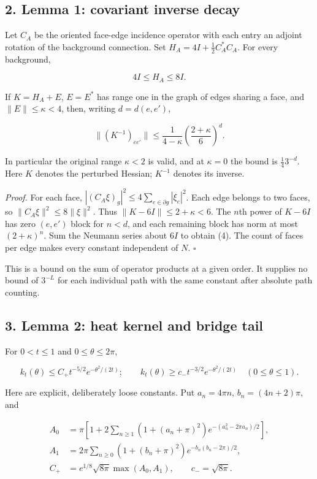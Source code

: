 \documentclass[11pt,a4paper]{article}
\begin{document}
\hypertarget{lemma-1-covariant-inverse-decay}{%
\subsection{2. Lemma 1: covariant inverse
decay}\label{lemma-1-covariant-inverse-decay}}

Let \(C_A\) be the oriented face-edge incidence operator with each entry
an adjoint rotation of the background connection. Set
\(H_A=4I+\frac12C_A^*C_A\). For every background,

\[4I\le H_A\le8I.\tag{3}\]

If \(K=H_A+E\), \(E=E^*\) has range one in the graph of edges sharing a
face, and \(\|E\|\le\kappa<4\), then, writing \(d=d(e,e')\),

\[\|(K^{-1})_{ee'}\|\le\frac1{4-\kappa}
\left(\frac{2+\kappa}{6}\right)^d.\tag{4}\]

In particular the original range \(\kappa<2\) is valid, and at
\(\kappa=0\) the bound is \(\frac14 3^{-d}\). Here \(K\) denotes the
perturbed Hessian; \(K^{-1}\) denotes its inverse.

\emph{Proof.} For each face,
\(|(C_A\xi)_g|^2\le4\sum_{e\in\partial g}|\xi_e|^2\). Each edge belongs
to two faces, so \(\|C_A\xi\|^2\le8\|\xi\|^2\). Thus
\(\|K-6I\|\le2+\kappa<6\). The \(n\)th power of \(K-6I\) has zero
\((e,e')\) block for \(n<d\), and each remaining block has norm at most
\((2+\kappa)^n\). Sum the Neumann series about \(6I\) to obtain (4). The
count of faces per edge makes every constant independent of \(N\).
\(\square\)

This is a bound on the sum of operator products at a given order. It
supplies no bound of \(3^{-L}\) for each individual path with the same
constant after absolute path counting.

\hypertarget{lemma-2-heat-kernel-and-bridge-tail}{%
\subsection{3. Lemma 2: heat kernel and bridge
tail}\label{lemma-2-heat-kernel-and-bridge-tail}}

For \(0<t\le1\) and \(0\le\theta\le2\pi\),

\[k_t(\theta)\le C_+t^{-5/2}e^{-\theta^2/(2t)};\qquad
k_t(\theta)\ge c_-t^{-3/2}e^{-\theta^2/(2t)}
\quad(0\le\theta\le1).\tag{5}\]

Here are explicit, deliberately loose constants. Put \(a_n=4\pi n\),
\(b_n=(4n+2)\pi\), and

\[\begin{aligned}
A_0&=\pi\left[1+2\sum_{n\ge1}(1+(a_n+\pi)^2)
 e^{-(a_n^2-2\pi a_n)/2}\right],\\
A_1&=2\pi\sum_{n\ge0}(1+(b_n+\pi)^2)
 e^{-b_n(b_n-2\pi)/2},\\
C_+&=e^{1/8}\sqrt{8\pi}\max(A_0,A_1),\qquad c_-=\sqrt{8\pi}.
\end{aligned}\tag{6}\]
\end{document}
